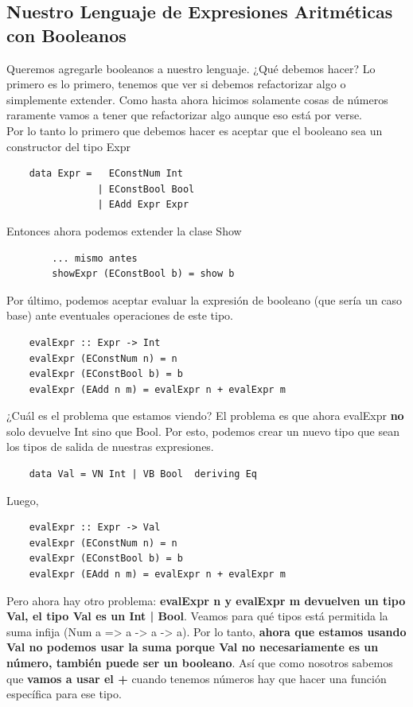 \documentclass[10pt,a4paper]{article}
\begin{document}
\subsection*{Nuestro Lenguaje de Expresiones Aritméticas con Booleanos}
Queremos agregarle booleanos a nuestro lenguaje. ¿Qué debemos hacer? Lo primero es lo primero, tenemos que ver si debemos refactorizar algo o simplemente extender. Como hasta ahora hicimos solamente cosas de números raramente vamos a tener que refactorizar algo aunque eso está por verse. \\
Por lo tanto lo primero que debemos hacer es aceptar que el booleano sea un constructor del tipo Expr
\begin{lstlisting}
    data Expr =   EConstNum Int 
                | EConstBool Bool 
                | EAdd Expr Expr 
\end{lstlisting}
Entonces ahora podemos extender la clase Show 
\begin{lstlisting}
        ... mismo antes
        showExpr (EConstBool b) = show b
\end{lstlisting}
Por último, podemos aceptar evaluar la expresión de booleano (que sería un caso base) ante eventuales operaciones de este tipo. \\
\begin{lstlisting}
    evalExpr :: Expr -> Int
    evalExpr (EConstNum n) = n
    evalExpr (EConstBool b) = b
    evalExpr (EAdd n m) = evalExpr n + evalExpr m
\end{lstlisting}
¿Cuál es el problema que estamos viendo? El problema es que ahora evalExpr \textbf{no} solo devuelve Int sino que Bool. Por esto, podemos crear un nuevo tipo que sean los tipos de salida de nuestras expresiones. \\
\begin{lstlisting}
    data Val = VN Int | VB Bool  deriving Eq
\end{lstlisting}
Luego, 
\begin{lstlisting}
    evalExpr :: Expr -> Val
    evalExpr (EConstNum n) = n
    evalExpr (EConstBool b) = b
    evalExpr (EAdd n m) = evalExpr n + evalExpr m
\end{lstlisting}
Pero ahora hay otro problema: \textbf{evalExpr n y evalExpr m devuelven un tipo Val, el tipo Val es un Int | Bool}. Veamos para qué tipos está permitida la suma infija (Num a => a -> a -> a). Por lo tanto, \textbf{ahora que estamos usando Val no podemos usar la suma porque Val no necesariamente es un número, también puede ser un booleano}. Así que como nosotros sabemos que \textbf{vamos a usar el +} cuando tenemos números hay que hacer una función específica para ese tipo. \\
\end{document}
